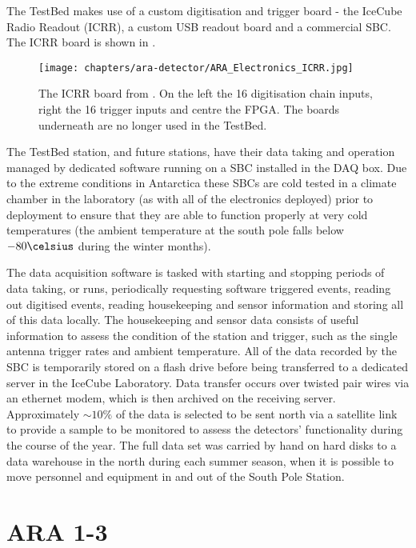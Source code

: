 The TestBed makes use of a custom digitisation and trigger board - the IceCube Radio Readout (ICRR), a custom USB readout board and a commercial SBC. The ICRR board is shown in .

\begin{figure}[htpb]
  \centering
  \texttt{[image: chapters/ara-detector/ARA\_Electronics\_ICRR.jpg]}
  \caption{The ICRR board from \cite{2011ICRC....4..350A}. On the left the 16 digitisation chain inputs, right the 16 trigger inputs and centre the FPGA. The boards underneath are no longer used in the TestBed.}
  \label{fig:ara-detector:TestBed:ICRR}
\end{figure}

The TestBed station, and future stations, have their data taking and operation managed by dedicated software running on a SBC installed in the DAQ box. Due to the extreme conditions in Antarctica these SBCs are cold tested in a climate chamber in the laboratory (as with all of the electronics deployed) prior to deployment to ensure that they are able to function properly at very cold temperatures (the ambient temperature at the south pole falls below $-80 \celsius $ during the winter months).

The data acquisition software is tasked with starting and stopping  periods of data taking, or runs, periodically requesting software triggered events, reading out digitised events, reading housekeeping and sensor information and storing all of this data locally. The housekeeping and sensor data consists of useful information to assess the condition of the station and trigger, such as the single antenna trigger rates and ambient temperature. All of the data recorded by the SBC is temporarily stored on a flash drive before being transferred to a dedicated server in the IceCube Laboratory. Data transfer occurs over twisted pair wires via an ethernet modem, which is then archived on the receiving server. Approximately $\sim 10 \%$ of the data is selected to be sent north via a satellite link to provide a sample to be monitored to assess the detectors' functionality during the course of the year. The full data set was carried by hand on hard disks to a data warehouse in the north during each summer season, when it is possible to move personnel and equipment in and out of the South Pole Station. 


\section{ARA 1-3}
\label{sec:ara-detector:ARA1-3}


